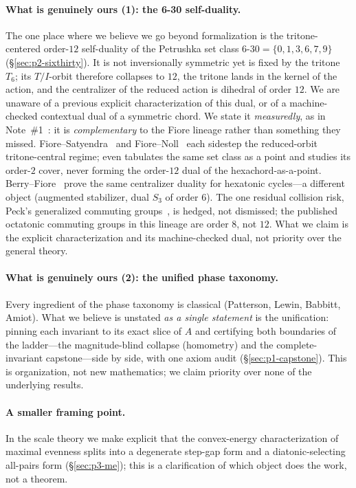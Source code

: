 \documentclass[11pt]{article}
\newcommand{\Ahat}{\hat{A}}
\begin{document}
\paragraph{What is genuinely ours (1): the 6-30 self-duality.} The one place where we believe we
go beyond formalization is the tritone-centered order-$12$ self-duality of the Petrushka set
class $6$-$30=\{0,1,3,6,7,9\}$ (\S\ref{sec:p2-sixthirty}). It is not inversionally symmetric yet
is fixed by the tritone $T_6$; its $T/I$-orbit therefore collapses to $12$, the tritone lands in
the kernel of the action, and the centralizer of the reduced action is dihedral of order $12$.
We are unaware of a previous explicit characterization of this dual, or of a machine-checked
contextual dual of a symmetric chord. We state it \emph{measuredly}, as in Note~\#1~\cite{Note1}: it is \emph{complementary} to the Fiore
lineage rather than something they missed. Fiore--Satyendra~\cite{FS} and
Fiore--Noll~\cite{FN11,FN25} each sidestep the reduced-orbit tritone-central regime;
\cite{FN11} even tabulates the same set class as a point and studies its order-$2$ cover, never
forming the order-$12$ dual of the hexachord-as-a-point. Berry--Fiore~\cite{BF} prove the same
centralizer duality for hexatonic cycles---a different object (augmented stabilizer, dual $S_3$
of order $6$). The one residual collision risk, Peck's generalized commuting groups~\cite{Peck},
is hedged, not dismissed; the published octatonic commuting groups in this lineage are order
$8$, not $12$. What we claim is the explicit characterization and its machine-checked dual, not
priority over the general theory.

\paragraph{What is genuinely ours (2): the unified phase taxonomy.} Every ingredient of the phase
taxonomy is classical (Patterson, Lewin, Babbitt, Amiot). What we believe is unstated \emph{as a
single statement} is the unification: pinning each invariant to its exact slice of $\Ahat$ and
certifying both boundaries of the ladder---the magnitude-blind collapse (homometry) and the
complete-invariant capstone---side by side, with one axiom audit (\S\ref{sec:p1-capstone}). This
is organization, not new mathematics; we claim priority over none of the underlying results.

\paragraph{A smaller framing point.} In the scale theory we make explicit that the convex-energy
characterization of maximal evenness splits into a degenerate step-gap form and a
diatonic-selecting all-pairs form (\S\ref{sec:p3-me}); this is a clarification of which object
does the work, not a theorem.
\end{document}
